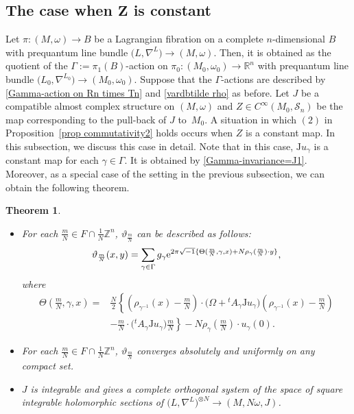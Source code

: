 \documentclass[10pt,a4paper]{amsart}
\numberwithin{equation}{section}
\newtheorem{Theorem}{Theorem}[section]
\newcommand{\R}{\mathbb{R}}
\newcommand{\Z}{\mathbb{Z}}
\def\J{\mathrm{J}}
\begin{document}
\subsection[The case when Z is constant]{The case when $\boldsymbol{Z}$ is constant}
Let $\pi\colon (M,\omega)\to B$ be a Lagrangian fibration on a complete $n$-dimensional $B$ with prequantum line bundle $\bigl(L,\nabla^L\bigr)\to (M,\omega)$. Then, it is obtained as the quotient of the $\Gamma:=\pi_1(B)$-action on $\pi_0\colon (M_0,\omega_0)\to \R^n$ with prequantum line bundle $\bigl({L_0}, \nabla^{L_0}\bigr)\to (M_0,\omega_0)$. Suppose that the $\Gamma$-actions are described by \eqref{Gamma-action on Rn times Tn} and \eqref{vardbtilde rho} as before. Let $J$ be a compatible almost complex structure on $(M,\omega)$ and $Z\in C^\infty (M_0, {\mathcal S}_n)$ be the map corresponding to the pull-back of $J$ to~$M_0$.
%
A situation in which $(2)$ in Proposition~\ref{prop commutativity2} holds occurs when $Z$ is a constant map. In this subsection, we discuss this case in detail. Note that in this case, $\J u_\gamma$ is a constant map for each $\gamma \in\Gamma$. It is obtained by \eqref{Gamma-invariance=J1}. Moreover, as a special case of the setting in the previous subsection, we can obtain the following theorem.
\begin{Theorem}\quad
\begin{itemize}\itemsep=0pt
\item[$(1)$] For each $\frac{m}{N}\in F\cap \frac{1}{N}\Z^n$, $\vartheta_{\frac{m}{N}}$ can be described as follows:
\begin{equation*}
\vartheta_{\frac{m}{N}}(x,y)=\sum_{\gamma \in \Gamma}g_\gamma {\rm e}^{2\pi\sqrt{-1}\{\Theta (\frac{m}{N}, \gamma, x)+N\rho_\gamma (\frac{m}{N})\cdot y\}},
\end{equation*}
where
\begin{align*}
\Theta \left(\frac{m}{N}, \gamma, x\right)={}&\frac{N}{2}\left\{\left(\rho_{\gamma^{-1}}(x)-\frac{m}{N}\right)\cdot \bigl(\Omega+{}^tA_\gamma \J u_\gamma\bigr)\left(\rho_{\gamma^{-1}}(x)-\frac{m}{N}\right)\right.\\
&\left.-\frac{m}{N}\cdot \bigl({}^tA_\gamma \J u_\gamma\bigr)\frac{m}{N}\right\}-N\rho_{\gamma}\left(\frac{m}{N}\right)\cdot u_\gamma (0) .
\end{align*}
\item[$(2)$] For each $\frac{m}{N}\in F\cap \frac{1}{N}\Z^n$, $\vartheta_{\frac{m}{N}}$ converges absolutely and uniformly on any compact set.
\item[$(3)$] $J$ is integrable and
\smash{$\{ \vartheta_{\frac{m}{N}}\}_{\frac{m}{N}\in F\cap \frac{1}{N}\Z^n}$} gives a complete orthogonal system of the space of square integrable holomorphic sections of $\bigl(L,\nabla^L\bigr)^{\otimes N}\to (M,N\omega, J)$.
\end{itemize}
\end{Theorem}
\end{document}
